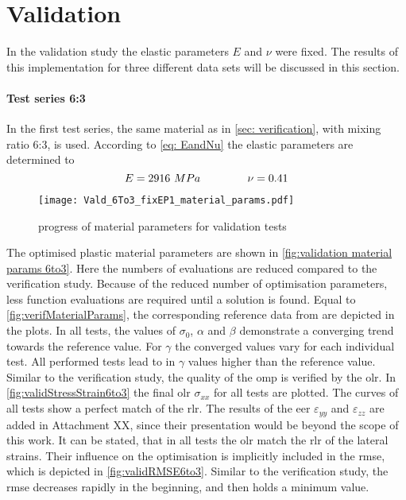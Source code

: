 \newpage
\section{Validation}\label{sec: validation}
 In the validation study the elastic parameters $E$ and $\nu$ were fixed. The results of this implementation for three different data sets will be discussed in this section.
\paragraph{Test series 6:3}
In the first test series, the same material as in \autoref{sec: verification}, with mixing ratio 6:3, is used. According to \autoref{eq: EandNu} the elastic parameters are determined to 
\begin{equation*}
    E = 2916 MPa \hspace{1.5cm} \nu = 0.41 
\end{equation*}

\begin{figure}[H]
    \centering
    \texttt{[image: Vald\_6To3\_fixEP1\_material\_params.pdf]}
    \caption{progress of material parameters for validation tests}
    \label{fig:validation material params 6to3}
\end{figure}

The optimised plastic material parameters are shown in \autoref{fig:validation material params 6to3}. Here the numbers of evaluations are reduced compared to the verification study. Because of the reduced number of optimisation parameters, less function evaluations are required until a solution is found.
Equal to \autoref{fig:verifMaterialParams}, the corresponding reference data from \citet{ries_deciphering_nodate} are depicted in the plots.
In all tests, the values of $\sigma_0$, $\alpha$ and $\beta$ demonstrate a converging trend towards the reference value.
For $\gamma$ the converged values vary for each individual test.
All performed tests lead to in $\gamma$ values higher than the reference value. Similar to the verification study, the quality of the \acrlong{omp} is verified by the \acrlong{olr}. In \autoref{fig:validStressStrain6to3} the final \acrlong{olr} $\sigma_{xx}$ for all tests are plotted. The curves of all tests show a perfect match of the \acrlong{rlr}. The results of the \acrlong{eer} $\varepsilon_{yy}$ and $\varepsilon_{zz}$ are added in Attachment XX, since their presentation would be beyond the scope of this work. It can be stated, that in all tests the \acrlong{olr} match the \acrlong{rlr} of the lateral strains. Their influence on the optimisation is implicitly included in the \acrshort{rmse}, which is depicted in \autoref{fig:validRMSE6to3}. Similar to the verification study, the \acrshort{rmse} decreases rapidly in the beginning, and then holds a minimum value.


